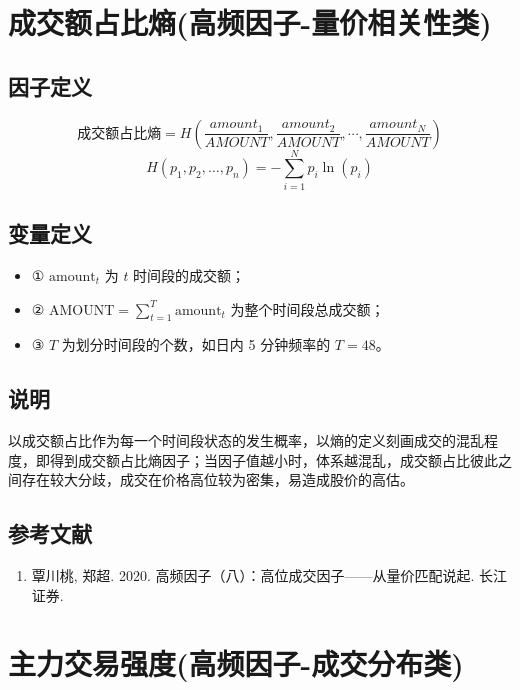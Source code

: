 \documentclass{article}
\begin{document}
\section{成交额占比熵(高频因子-量价相关性类)}

\subsection{因子定义}
\begin{equation}
    \text{成交额占比熵} = H(\frac{amount_1}{AMOUNT},\frac{amount_2}{AMOUNT},\cdots,\frac{amount_N}{AMOUNT})
\end{equation}
\begin{equation}
    H(p_1, p_2, \dots, p_n) = -\sum_{i=1}^N p_i \ln(p_i)
\end{equation}

\subsection{变量定义}
\begin{itemize}
    \item ① \( \mathrm{amount}_t \) 为 \( t \) 时间段的成交额；
    \item ② \(\displaystyle \mathrm{AMOUNT} = \sum_{t=1}^T \mathrm{amount}_t\) 为整个时间段总成交额；
    \item ③ \( T \) 为划分时间段的个数，如日内 5 分钟频率的 \( T=48 \)。
\end{itemize}

\subsection{说明}
以成交额占比作为每一个时间段状态的发生概率，以熵的定义刻画成交的混乱程度，即得到成交额占比熵因子；当因子值越小时，体系越混乱，成交额占比彼此之间存在较大分歧，成交在价格高位较为密集，易造成股价的高估。

\subsection{参考文献}
\begin{enumerate}
    \item 覃川桃, 郑超. 2020. 高频因子（八）：高位成交因子——从量价匹配说起. 长江证券.
\end{enumerate}

\section{主力交易强度(高频因子-成交分布类)}
\end{document}
